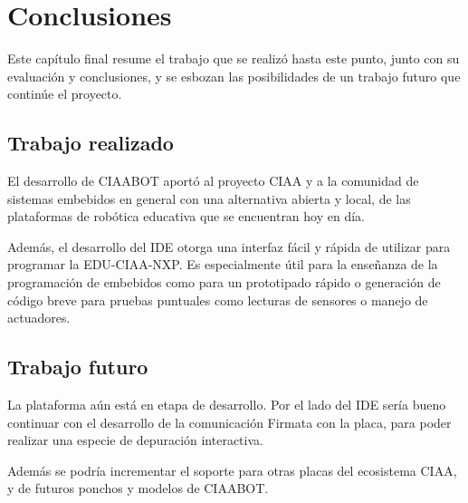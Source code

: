 
\chapter{Conclusiones} %

\label{Chapter5} %




Este capítulo final resume el trabajo que se realizó hasta este punto, junto con su evaluación y conclusiones, y se esbozan las posibilidades de un trabajo futuro que continúe el proyecto.

\section{Trabajo realizado}
El desarrollo de CIAABOT aportó al proyecto CIAA y a la comunidad de sistemas embebidos en general con una alternativa abierta y local, de las plataformas de robótica educativa que se encuentran hoy en día.

Además, el desarrollo del IDE otorga una interfaz fácil y rápida de utilizar para programar la EDU-CIAA-NXP. Es especialmente útil para la enseñanza de la programación de embebidos como para un prototipado rápido o generación de código breve para pruebas puntuales como lecturas de sensores o manejo de actuadores.

\section{Trabajo futuro}
La plataforma aún está en etapa de desarrollo. Por el lado del IDE sería bueno continuar con el desarrollo de la comunicación Firmata con la placa, para poder realizar una especie de depuración interactiva.

Además se podría incrementar el soporte para otras placas del ecosistema CIAA, y de futuros ponchos y modelos de CIAABOT.

